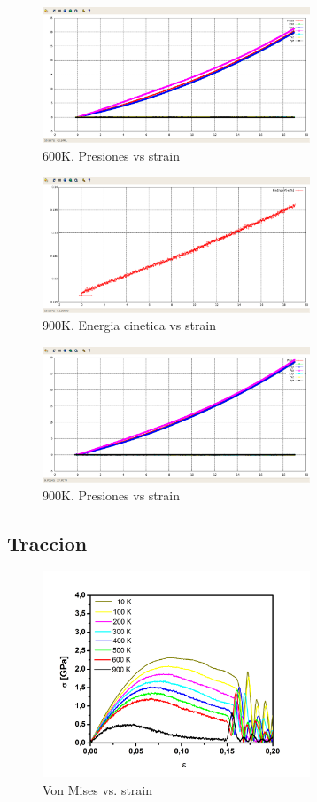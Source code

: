 \documentclass[10pt, oneside]{article} %
\begin{document}
\begin{figure}[H]
\centering
\includegraphics[width=8cm]{Figures/600-Tensiones-deformacion.png}
\caption{600K. Presiones vs strain}
\end{figure}

\begin{figure}[H]
\centering
\includegraphics[width=8cm]{Figures/900-KinEng-deformacion.png}
\caption{900K. Energia cinetica vs strain}
\end{figure}

\begin{figure}[H]
\centering
\includegraphics[width=8cm]{Figures/900-Tensiones-deformacion.png}
\caption{900K. Presiones vs strain}
\end{figure}

%
%

\subsection{Traccion}

\begin{figure}[H]
\centering
\includegraphics[width=8cm]{Figures/stress_strain_TEN.png}
\caption{Von Mises vs. strain}
\end{figure}
\end{document}
